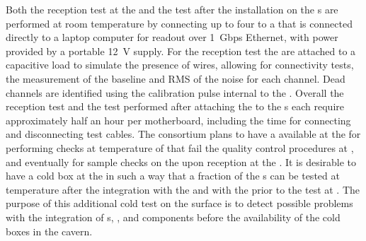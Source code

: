 Both the reception test at the  and the test after the
installation on the s are performed at room temperature 
by connecting up to four  to a  that is 
connected directly to a laptop computer for readout over 1~Gbps
Ethernet, with power provided by a portable 12~V supply. For 
the reception test the  are attached to a capacitive 
load to simulate the presence of wires, allowing for connectivity 
tests, the measurement of the baseline and RMS of the noise for 
each channel. Dead channels are identified using the calibration 
pulse internal to the  . Overall the reception 
test and the test performed after attaching the  to the 
s each require approximately half an hour per motherboard, 
including  the time for connecting and disconnecting test cables.
The  consortium plans to have a  available
at the  for performing checks at \lntwo temperature
of  that fail the quality control procedures at \surf,
and eventually for sample checks on the  upon reception
at the . It is desirable to have a cold box at the 
in such a way that a fraction of the s can be tested at
\lntwo temperature after the integration with the 
and with the  prior to the test at 
\surf. The purpose of this additional cold test on the surface is to
detect possible problems with the integration of s, ,
and  components before the availability of the cold
boxes in the \surf cavern.

